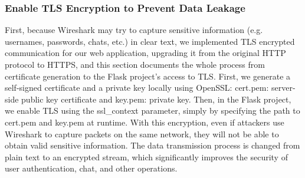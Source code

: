 \documentclass{article}
\begin{document}
\subsubsection{Enable TLS Encryption to Prevent Data Leakage }
First, because Wireshark may try to capture sensitive information (e.g. usernames, passwords, chats, etc.) in clear text, we implemented TLS encrypted communication for our web application, upgrading it from the original HTTP protocol to HTTPS, and this section documents the whole process from certificate generation to the Flask project's access to TLS. 
First, we generate a self-signed certificate and a private key locally using OpenSSL: cert.pem: server-side public key certificate and key.pem: private key. Then, in the Flask project, we enable TLS using the ssl\_context parameter, simply by specifying the path to cert.pem and key.pem at runtime. 
With this encryption, even if attackers use Wireshark to capture packets on the same network, they will not be able to obtain valid sensitive information. 
The data transmission process is changed from plain text to an encrypted stream, which significantly improves the security of user authentication, chat, and other operations.
\end{document}

